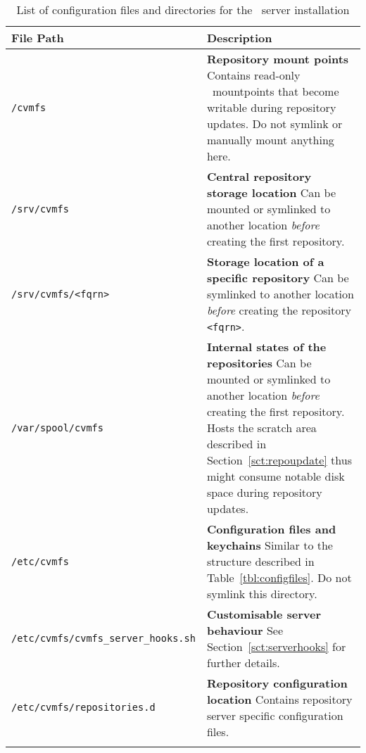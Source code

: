 \begin{longtable}{lX}
	\toprule
	{\bf\centering File Path} & {\bf\centering Description} \\
	\midrule

	\texttt{/cvmfs} & \textbf{Repository mount points} \newline
	Contains read-only \aufs\ mountpoints that become writable during repository updates. Do not symlink or manually mount anything here. \\
	\addlinespace

	\texttt{/srv/cvmfs} & \textbf{Central repository storage location} \newline
	Can be mounted or symlinked to another location \emph{before} creating the first repository. \\
	\addlinespace

	\texttt{/srv/cvmfs/<fqrn>} & \textbf{Storage location of a specific repository} \newline
	Can be symlinked to another location \emph{before} creating the repository \texttt{<fqrn>}. \\
	\addlinespace

	\texttt{/var/spool/cvmfs} & \textbf{Internal states of the repositories} \newline
	Can be mounted or symlinked to another location \emph{before} creating the first repository. 
	Hosts the scratch area described in Section~\ref{sct:repoupdate} thus might consume notable disk space during repository updates. \\
	\addlinespace

	\texttt{/etc/cvmfs} & \textbf{Configuration files and keychains} \newline
	Similar to the structure described in Table~\ref{tbl:configfiles}. Do not symlink this directory. \\
	\addlinespace

	\texttt{/etc/cvmfs/cvmfs\_server\_hooks.sh} & \textbf{Customisable server behaviour} \newline
	See Section~\ref{sct:serverhooks} for further details. \\
	\addlinespace

	\texttt{/etc/cvmfs/repositories.d} & \textbf{Repository configuration location} \newline
	Contains repository server specific configuration files.
	 \\
	\bottomrule
	\caption{List of configuration files and directories for the \cvmfs\ server installation}
	\label{tbl:serveranatomyelements}
\end{longtable}
